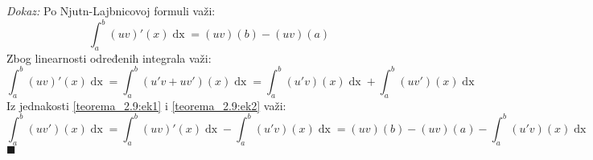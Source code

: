 \documentclass{article}
\DeclareMathOperator{\dx}{dx}
\begin{document}
\textit{Dokaz:} Po Njutn-Lajbnicovoj formuli važi:
\begin{equation}
    \label{teorema_2.9:ek1}
    \displaystyle\int^b_a \left(uv\right)'\left(x\right)\dx = \left(uv\right)\left(b\right) - \left(uv\right)\left(a\right)
\end{equation}
Zbog linearnosti određenih integrala važi:
\begin{equation}
    \label{teorema_2.9:ek2}
    \displaystyle\int^b_a \left(uv\right)'\left(x\right)\dx = \int^b_a\left(u'v + uv'\right)\left(x\right)\dx = \int^b_a\left(u'v\right)\left(x\right)\dx + \int^b_a\left(uv'\right)\left(x\right)\dx
\end{equation}
Iz jednakosti \eqref{teorema_2.9:ek1} i \eqref{teorema_2.9:ek2} važi:
$$\int^b_a\left(uv'\right)\left(x\right)\dx=\displaystyle\int^b_a \left(uv\right)'\left(x\right)\dx - \int^b_a\left(u'v\right)\left(x\right)\dx= \left(uv\right)\left(b\right) - \left(uv\right)\left(a\right) - \int^b_a\left(u'v\right)\left(x\right)\dx$$
\null\hfill $\blacksquare$\par
\end{document}
